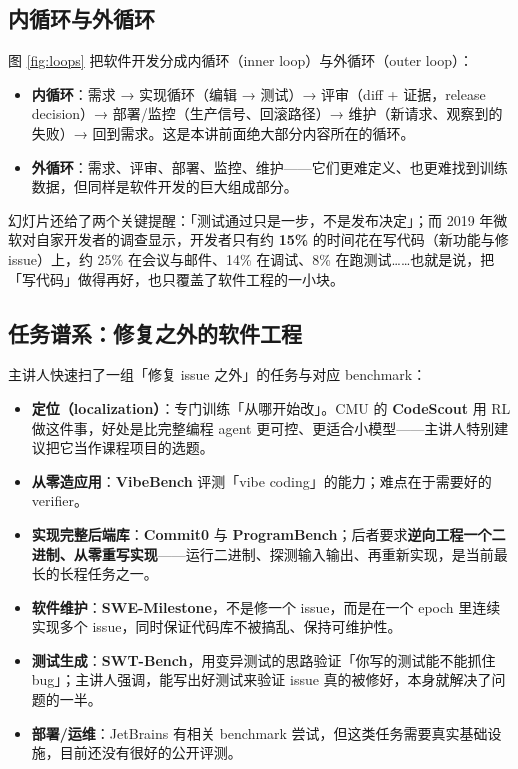 ﻿\documentclass[a4paper]{article}
\begin{document}
\subsection{内循环与外循环}

图 \ref{fig:loops} 把软件开发分成内循环（inner loop）与外循环（outer loop）：

\begin{itemize}
\item \textbf{内循环}：需求 → 实现循环（编辑 → 测试）→ 评审（diff + 证据，release decision）→ 部署/监控（生产信号、回滚路径）→ 维护（新请求、观察到的失败）→ 回到需求。这是本讲前面绝大部分内容所在的循环。
\item \textbf{外循环}：需求、评审、部署、监控、维护——它们更难定义、也更难找到训练数据，但同样是软件开发的巨大组成部分。
\end{itemize}

幻灯片还给了两个关键提醒：「测试通过只是一步，不是发布决定」；而 2019 年微软对自家开发者的调查显示，开发者只有约 \textbf{15\%} 的时间花在写代码（新功能与修 issue）上，约 25\% 在会议与邮件、14\% 在调试、8\% 在跑测试……也就是说，把「写代码」做得再好，也只覆盖了软件工程的一小块。

\subsection{任务谱系：修复之外的软件工程}

主讲人快速扫了一组「修复 issue 之外」的任务与对应 benchmark：

\begin{itemize}
\item \textbf{定位（localization）}：专门训练「从哪开始改」。CMU 的 \textbf{CodeScout} 用 RL 做这件事，好处是比完整编程 agent 更可控、更适合小模型——主讲人特别建议把它当作课程项目的选题。
\item \textbf{从零造应用}：\textbf{VibeBench} 评测「vibe coding」的能力；难点在于需要好的 verifier。
\item \textbf{实现完整后端库}：\textbf{Commit0} 与 \textbf{ProgramBench}；后者要求\textbf{逆向工程一个二进制、从零重写实现}——运行二进制、探测输入输出、再重新实现，是当前最长的长程任务之一。
\item \textbf{软件维护}：\textbf{SWE-Milestone}，不是修一个 issue，而是在一个 epoch 里连续实现多个 issue，同时保证代码库不被搞乱、保持可维护性。
\item \textbf{测试生成}：\textbf{SWT-Bench}，用变异测试的思路验证「你写的测试能不能抓住 bug」；主讲人强调，能写出好测试来验证 issue 真的被修好，本身就解决了问题的一半。
\item \textbf{部署/运维}：JetBrains 有相关 benchmark 尝试，但这类任务需要真实基础设施，目前还没有很好的公开评测。
\end{itemize}
\end{document}

